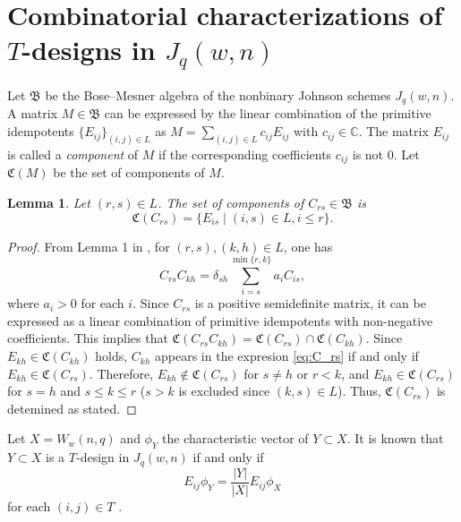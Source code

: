 \documentclass[a4paper, 11pt]{article}
\newtheorem{lemma}[theorem]{Lemma}
\theoremstyle{definition}
\begin{document}
\section{Combinatorial characterizations of $T$-designs in $J_q(w,n)$}  \label{sec:3}
Let $\mathfrak{B}$ be the Bose--Mesner algebra of the nonbinary Johnson schemes $J_q(w,n)$. 
A matrix $M\in \mathfrak{B}$ can be expressed by the linear combination of the primitive idempotents $\{E_{ij}\}_{(i,j) \in L}$ as $M=\sum_{(i,j) \in L} c_{ij} E_{ij}$ with $c_{ij} \in \mathbb{C}$. 
The matrix $E_{ij}$ is called a {\it component} of $M$ if the corresponding coefficients $c_{ij}$ is not $0$. 
Let $\mathfrak{C}(M)$ be the set of components of $M$. 
\begin{lemma} \label{lem:component}
Let $(r,s) \in L$. 
The set of components of $C_{rs} \in \mathfrak{B}$ is 
\[
\mathfrak{C}(C_{rs})=\{E_{is}  \mid (i,s) \in L, i\leq r  \}.
\]
\end{lemma}
\begin{proof}
From Lemma 1 in \cite{TAG85}, for $(r,s),(k,h) \in L$, one has
\begin{equation}\label{eq:C_rs}
C_{rs}C_{kh}=\delta_{sh} \sum_{i=s}^{\min \{r,k\}} a_{i} C_{is},   
\end{equation}
where $a_i >0$ for each $i$. 
Since $C_{rs}$ is a positive semidefinite matrix, 
it can be expressed as a linear combination of primitive idempotents with non-negative coefficients. 
This implies that $\mathfrak{C}(C_{rs}C_{kh}) =\mathfrak{C}(C_{rs})\cap \mathfrak{C}(C_{kh})$. 
Since $E_{kh} \in \mathfrak{C}(C_{kh})$ holds, $C_{kh}$ appears in the expresion \eqref{eq:C_rs} if and only if $E_{kh}\in  \mathfrak{C}(C_{rs})$.  
Therefore, $E_{kh} \not\in \mathfrak{C}(C_{rs})$ for $s\ne h$ or $r<k$, and  $E_{kh} \in \mathfrak{C}(C_{rs})$ for $s=h$ and $s\leq k\leq r$ ($s>k$ is excluded since $(k,s)\in L$).  Thus, $\mathfrak{C}(C_{rs})$ is detemined as stated. 
\end{proof}
Let $X=W_w(n,q)$ and $\phi_Y$ the characteristic vector of $Y \subset X$. 
It is known that $Y \subset X$ is a $T$-design in $J_q(w,n) $ if and only if  
\begin{equation} \label{eq:E_ij}
E_{ij}\phi_Y=\frac{|Y|}{|X|}E_{ij}\phi_X    
\end{equation}
for each $(i,j) \in T$ \cite[Theorem 3.10]{D73}.
\end{document}

